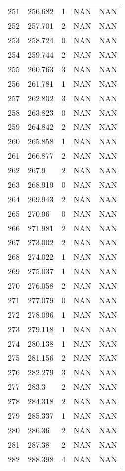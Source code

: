 \documentclass{article}
\begin{document}
\begin{longtable}{@{}lllll@{}}
				251 & 256.682 & 1    & NAN  & NAN  \\
				252 & 257.701 & 2    & NAN  & NAN  \\
				253 & 258.724 & 0    & NAN  & NAN  \\
				254 & 259.744 & 2    & NAN  & NAN  \\
				255 & 260.763 & 3    & NAN  & NAN  \\
				256 & 261.781 & 1    & NAN  & NAN  \\
				257 & 262.802 & 3    & NAN  & NAN  \\
				258 & 263.823 & 0    & NAN  & NAN  \\
				259 & 264.842 & 2    & NAN  & NAN  \\
				260 & 265.858 & 1    & NAN  & NAN  \\
				261 & 266.877 & 2    & NAN  & NAN  \\
				262 & 267.9   & 2    & NAN  & NAN  \\
				263 & 268.919 & 0    & NAN  & NAN  \\
				264 & 269.943 & 2    & NAN  & NAN  \\
				265 & 270.96  & 0    & NAN  & NAN  \\
				266 & 271.981 & 2    & NAN  & NAN  \\
				267 & 273.002 & 2    & NAN  & NAN  \\
				268 & 274.022 & 1    & NAN  & NAN  \\
				269 & 275.037 & 1    & NAN  & NAN  \\
				270 & 276.058 & 2    & NAN  & NAN  \\
				271 & 277.079 & 0    & NAN  & NAN  \\
				272 & 278.096 & 1    & NAN  & NAN  \\
				273 & 279.118 & 1    & NAN  & NAN  \\
				274 & 280.138 & 1    & NAN  & NAN  \\
				275 & 281.156 & 2    & NAN  & NAN  \\
				276 & 282.279 & 3    & NAN  & NAN  \\
				277 & 283.3   & 2    & NAN  & NAN  \\
				278 & 284.318 & 2    & NAN  & NAN  \\
				279 & 285.337 & 1    & NAN  & NAN  \\
				280 & 286.36  & 2    & NAN  & NAN  \\
				281 & 287.38  & 2    & NAN  & NAN  \\
				282 & 288.398 & 4    & NAN  & NAN  \\

\end{longtable}
\end{document}

